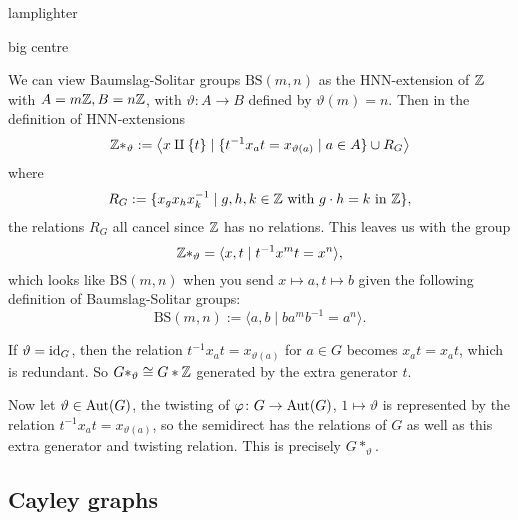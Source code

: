 \begin{ex}
    lamplighter
\end{ex}
\begin{ex}
    big centre
\end{ex}
\begin{ex}
    We can view Baumslag-Solitar groups $\mathrm{BS}(m,n)$ as the HNN-extension of $\mathbb{Z}$ with $A=m\mathbb{Z}, B= n \mathbb{Z}$, with $\vartheta \colon A \to B $ defined by $\vartheta (m)=n$. Then in the definition of HNN-extensions
    \[
        \mathbb{Z} * _{\vartheta} := \left\langle x \amalg \{t\} \mid  \{t ^{-1} x_a t = x _{\vartheta(a)}\mid a \in A\} \cup R_G  \right\rangle 
    \] where \[
    R_G := \{x_g x_h x_k ^{-1} \mid g,h ,k \in \mathbb{Z} \text{ with } g \cdot h =k \text{ in } \mathbb{Z}\} ,
    \]the relations $R_G$ all cancel since $\mathbb{Z}$ has no relations. This leaves us with the group \[
    \mathbb{Z} * _{\vartheta} = \langle x,t \mid t ^{-1} x^m t = x^n \rangle ,
\] which looks like $\mathrm{BS}(m,n)$ when you send $x \mapsto a, t \mapsto  b$ given the following definition of Baumslag-Solitar groups:
    \[
        \mathrm{BS}(m,n) := \langle a,b \mid  b a^m b^{-1} = a^n  \rangle .
    \]
\end{ex}
\begin{ex}
    If $\vartheta=\operatorname{id}_G$, then the relation  $t^{-1} x_at=x_{\vartheta(a)}$ for $a \in G$ becomes $x_at=x_at$, which is redundant. So $G *_{\vartheta}\cong G * \mathbb{Z}$ generated by the extra generator $t$.

    Now let $\vartheta \in \mathrm{Aut}(G)$, the twisting of $\varphi \colon G \to \mathrm{Aut}(G)$, $1 \mapsto \vartheta$ is represented by the relation $t ^{-1} x_a t = x _{\vartheta(a)}$, so the semidirect has the relations of $G$ as well as this extra generator and twisting relation. This is precisely $G *_{\vartheta}$.
\end{ex}

\subsection{Cayley graphs}
\begin{ex}
    
\end{ex}

